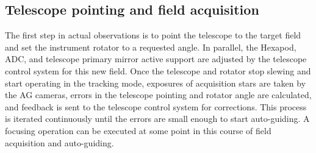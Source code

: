 \documentclass[a4paper]{article}
\begin{document}
\subsection{Telescope pointing and field acquisition\label{sec:detail_ope_plan:acquisition}}
The first step in actual observations is to point the telescope to the
target field and set the instrument rotator to a requested angle.  In
parallel, the Hexapod, ADC, and telescope primary mirror active
support are adjusted by the telescope control system for this new
field. Once the telescope and rotator stop slewing and start operating
in the tracking mode, exposures of acquisition stars are taken by the
AG cameras, errors in the telescope pointing and rotator angle are
calculated, and feedback is sent to the telescope control system for
corrections.  This process is iterated continuously until the errors
are small enough to start auto-guiding. A focusing operation can be
executed at some point in this course of field acquisition and
auto-guiding.
\end{document}

